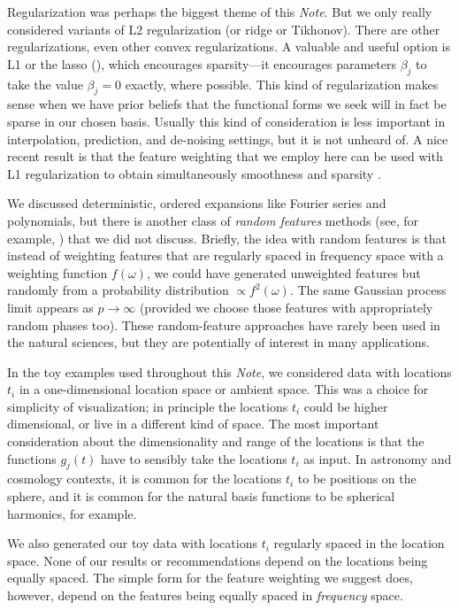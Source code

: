 \documentclass[12pt,letterpaper]{article}
\newcommand{\documentname}{\textsl{Note}}
\begin{document}
Regularization was perhaps the biggest theme of this \documentname.
But we only really considered variants of L2 regularization (or ridge or Tikhonov).
There are other regularizations, even other convex regularizations.
A valuable and useful option is L1 or the lasso (\citealt{lasso}), which encourages sparsity---it encourages parameters $\beta_j$ to take the value $\beta_j=0$ exactly, where possible.
This kind of regularization makes sense when we have prior beliefs that the functional forms we seek will in fact be sparse in our chosen basis.
Usually this kind of consideration is less important in interpolation, prediction, and de-noising settings, but it is not unheard of.
A nice recent result is that the feature weighting that we employ here can be used with L1 regularization to obtain simultaneously smoothness and sparsity \citep{rauhut2016interpolation}.

We discussed deterministic, ordered expansions like Fourier series and polynomials, but there is another class of \emph{random features} methods (see, for example, \citealt{rahimi2007random}) that we did not discuss.
Briefly, the idea with random features is that instead of weighting features that are regularly spaced in frequency space with a weighting function $f(\omega)$, we could have generated unweighted features but randomly from a probability distribution $\propto f^2(\omega)$.
The same Gaussian process limit appears as $p\rightarrow\infty$ (provided we choose those features with appropriately random phases too).
These random-feature approaches have rarely been used in the natural sciences, but they are potentially of interest in many applications.

In the toy examples used throughout this \documentname, we considered data with locations $t_i$ in a one-dimensional location space or ambient space.
This was a choice for simplicity of visualization; in principle the locations $t_i$ could be higher dimensional, or live in a different kind of space.
The most important consideration about the dimensionality and range of the locations is that the functions $g_j(t)$ have to sensibly take the locations $t_i$ as input.
In astronomy and cosmology contexts, it is common for the locations $t_i$ to be positions on the sphere, and it is common for the natural basis functions to be spherical harmonics, for example.

We also generated our toy data with locations $t_i$ regularly spaced in the location space.
None of our results or recommendations depend on the locations being equally spaced.
The simple form for the feature weighting we suggest does, however, depend on the features being equally spaced in \emph{frequency} space.
\end{document}
